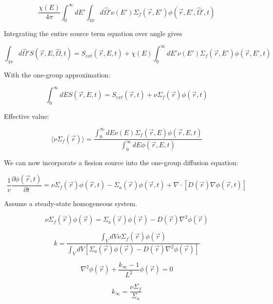 \documentclass[12pt]{article}
\newcommand{\rvec}{\ensuremath{\vec{r}}}
\newcommand{\omvec}{\ensuremath{\hat{\Omega}}}
\begin{document}
\begin{equation*}
\frac{\chi(E)}{4\pi}\int_0^{\infty}dE'
\int_{4\pi}d\omvec'\nu(E')\Sigma_f(\rvec,E')\phi(\rvec,E',\omvec',t)
\end{equation*}

Integrating the entire source term equation over angle gives

\begin{equation*}
\int_{4\pi}d\omvec'S(\rvec,E,\omvec,t) = S_{ext}(\rvec,E,t) + 
\chi(E)\int_0^{\infty}dE'\nu(E')\Sigma_f(\rvec,E')\phi(\rvec,E',t)
\end{equation*}

With the one-group approximation:

\begin{equation*}
\int_{0}^{\infty}dE S(\rvec,E,t) = S_{ext}(\rvec,t) + 
\nu\Sigma_f(\rvec)\phi(\rvec,t)
\end{equation*}

Effective value:

\begin{equation*}
\langle\nu\Sigma_f(\rvec)\rangle = 
\frac{\int_{0}^{\infty}dE\nu(E)\Sigma_f(\rvec,E)\phi(\rvec,E,t)}{\int_{0}^{\infty}dE\phi(\rvec,E,t)}
\end{equation*}

We can now incorporate a fission source into the one-group diffusion equation:

\begin{equation*}
\frac{1}{v}\frac{\partial\phi(\rvec,t)}{\partial t} = \nu\Sigma_f(\rvec)\phi(\rvec,t) - 
\Sigma_a(\rvec)\phi(\rvec,t) + \nabla\cdot[D(\rvec)\nabla\phi(\rvec,t)]
\end{equation*}

Assume a steady-state homogeneous system.

\begin{equation*}
\nu\Sigma_f(\rvec)\phi(\rvec) = 
\Sigma_a(\rvec)\phi(\rvec) - D(\rvec)\nabla^2\phi(\rvec)
\end{equation*}

\begin{equation*}
k = \frac{\int_V dV\nu\Sigma_f(\rvec)\phi(\rvec)}{\int_V dV[\Sigma_a(\rvec)\phi(\rvec) - D(\rvec)\nabla^2\phi(\rvec)]}
\end{equation*}

\begin{equation*}
\nabla^2\phi(\rvec) + \frac{k_{\infty} - 1}{L^2}\phi(\rvec) = 0
\end{equation*}

\begin{equation*}
k_{\infty} = \frac{\nu\Sigma_f}{\Sigma_a}
\end{equation*}
\end{document}
